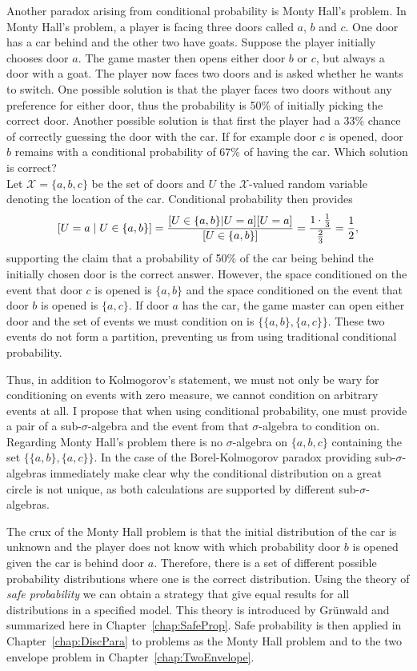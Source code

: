 \documentclass[a4paper]{report}
\theoremstyle{plain}
\theoremstyle{definition}
\theoremstyle{remark}
\numberwithin{equation}{chapter}
\let\P\relax
\DeclareMathOperator{\P}{\mathbb{P}}
\DeclareMathOperator{\1}{\mathbbm{1}}
\newcommand{\X}{\mathcal{X}}
\begin{document}
Another paradox arising from conditional probability is Monty Hall's problem. In Monty Hall's problem, a player is facing three doors called $a$, $b$ and $c$. One door has a car behind and the other two have goats. Suppose the player initially chooses door $a$. The game master then opens either door $b$ or $c$, but always a door with a goat. The player now faces two doors and is asked whether he wants to switch. One possible solution is that the player faces two doors without any preference for either door, thus the probability is 50\% of initially picking the correct door. Another possible solution is that first the player had a 33\% chance of correctly guessing the door with the car. If for example door $c$ is opened, door $b$ remains with a conditional probability of 67\% of having the car. Which solution is correct?\\
Let $\X=\{a,b,c\}$ be the set of doors and $U$ the $\X$-valued random variable denoting the location of the car. Conditional probability then provides
\begin{equation*}\label{eq:IntMonty}
\P[U=a\mid U\in\{a,b\}]=\frac{\P[U\in\{a,b\}|U=a]\P[U=a]}{\P[U\in\{a,b\}]}=\frac{1\cdot\frac{1}{3}}{\frac{2}{3}}=\frac{1}{2},
\end{equation*}
supporting the claim that a probability of 50\% of the car being behind the initially chosen door is the correct answer. However, the space conditioned on the event that door $c$ is opened is $\{a,b\}$ and the space conditioned on the event that door $b$ is opened is $\{a,c\}$. If door $a$ has the car, the game master can open either door and the set of events we must condition on is $\{\{a,b\},\{a,c\}\}$. These two events do not form a partition, preventing us from using traditional conditional probability.

Thus, in addition to Kolmogorov's statement, we must not only be wary for conditioning on events with zero measure, we cannot condition on arbitrary events at all. I propose that when using conditional probability, one must provide a pair of a sub-$\sigma$-algebra and the event from that $\sigma$-algebra to condition on. Regarding Monty Hall's problem there is no $\sigma$-algebra on $\{a,b,c\}$ containing the set $\{\{a,b\},\{a,c\}\}$. In the case of the Borel-Kolmogorov paradox providing sub-$\sigma$-algebras immediately make clear why the conditional distribution on a great circle is not unique, as both calculations are supported by different sub-$\sigma$-algebras.

The crux of the Monty Hall problem is that the initial distribution of the car is unknown and the player does not know with which probability door $b$ is opened given the car is behind door $a$. Therefore, there is a set of different possible probability distributions where one is the correct distribution. Using the theory of \emph{safe probability} we can obtain a strategy that give equal results for all distributions in a specified model. This theory is introduced by Grünwald \cite{Grunwald18} and summarized here in Chapter~\ref{chap:SafeProp}. Safe probability is then applied in Chapter~\ref{chap:DiscPara} to problems as the Monty Hall problem and to the two envelope problem in Chapter~\ref{chap:TwoEnvelope}.
\end{document}
